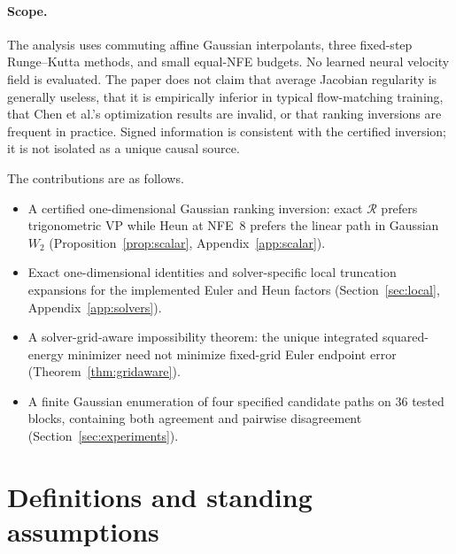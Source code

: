 \documentclass[11pt,a4paper]{article}
\theoremstyle{remark}
\newcommand{\wtwo}{W_2}
\newcommand{\cR}{\mathcal{R}}
\begin{document}
\paragraph{Scope.}
The analysis uses commuting affine Gaussian interpolants, three
fixed-step Runge--Kutta methods, and small equal-NFE budgets. No learned
neural velocity field is evaluated. The paper does not claim that
average Jacobian regularity is generally useless, that it is empirically
inferior in typical flow-matching training, that Chen et al.'s
optimization results are invalid, or that ranking inversions are
frequent in practice. Signed information is consistent with the
certified inversion; it is not isolated as a unique causal source.

The contributions are as follows.
\begin{itemize}
\item A certified one-dimensional Gaussian ranking inversion: exact
  $\cR$ prefers trigonometric VP while Heun at NFE~$8$ prefers the linear
  path in Gaussian $\wtwo$ (Proposition~\ref{prop:scalar},
  Appendix~\ref{app:scalar}).
\item Exact one-dimensional identities and solver-specific local
  truncation expansions for the implemented Euler and Heun factors
  (Section~\ref{sec:local}, Appendix~\ref{app:solvers}).
\item A solver-grid-aware impossibility theorem: the unique integrated
  squared-energy minimizer need not minimize fixed-grid Euler endpoint
  error (Theorem~\ref{thm:gridaware}).
\item A finite Gaussian enumeration of four specified candidate paths on
  $36$ tested blocks, containing both agreement and pairwise disagreement
  (Section~\ref{sec:experiments}).
\end{itemize}

\section{Definitions and standing assumptions}
\label{sec:definitions}
\end{document}
